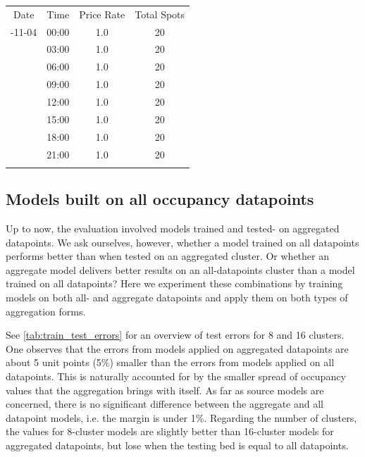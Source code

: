 	\begin{table}
		{\begin{tabular}{cccc}	
				\toprule
				Date & Time & Price Rate & Total Spots \\
				\colrule
				2017-11-04 & 	00:00 & 1.0 & 20 \\
				& 	03:00 & 1.0 & 20 \\
				& 	06:00 & 1.0 & 20 \\
				& 	09:00 & 1.0 & 20 \\
				& 	12:00 & 1.0 & 20 \\
				& 	15:00 & 1.0 & 20 \\
				& 	18:00 & 1.0 & 20 \\
				& 	21:00 & 1.0 & 20 \\
				\botrule
		\end{tabular}}
		\label{tab:ml_cwout}
	\end{table}
				
	\subsection{Models built on all occupancy datapoints}
	Up to now, the evaluation involved models trained and tested- on aggregated datapoints. 
	We ask ourselves, however, whether a model trained on all datapoints performs better than when tested on an aggregated cluster. Or whether an aggregate model delivers better results on an all-datapoints cluster than a model trained on all datapoints? Here we experiment these combinations by training models on both all- and aggregate datapoints and apply them on both types of aggregation forms. 
	
	See \cref{tab:train_test_errors} for an overview of test errors for 8 and 16 clusters. One observes that the errors from models applied on aggregated datapoints are about 5 unit points (5\%) smaller than the errors from models applied on all datapoints. This is naturally accounted for by the smaller spread of occupancy values that the aggregation brings with itself. As far as source models are concerned, there is no significant difference between the aggregate and all datapoint models, i.e. the margin is under 1\%. Regarding the number of clusters, the values for 8-cluster models are slightly better than 16-cluster models for aggregated datapoints, but lose when the testing bed is equal to all datapoints.
	
